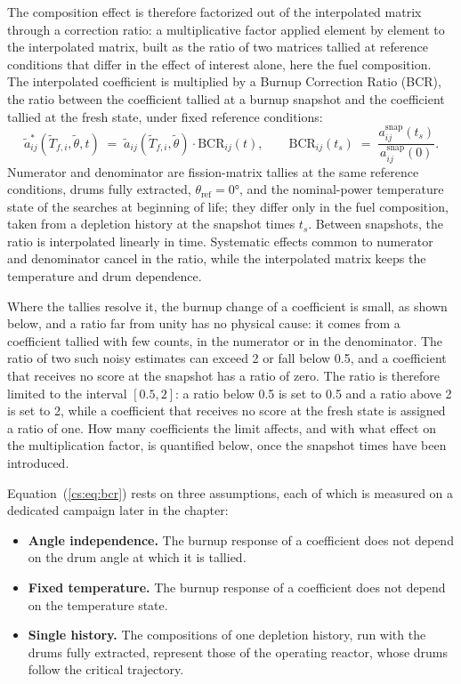 The composition effect is therefore factorized out of the interpolated matrix
through a correction ratio: a multiplicative factor applied element by
element to the interpolated matrix, built as the ratio of two matrices
tallied at reference conditions that differ in the effect of interest alone,
here the fuel composition. The interpolated coefficient is multiplied by a Burnup Correction Ratio (BCR), the ratio between the
coefficient tallied at a burnup snapshot and the coefficient tallied at the
fresh state, under fixed reference conditions:
%
\begin{equation}
  \tilde a^{*}_{ij}(\tilde T_{f,i},\tilde\theta,t) \;=\;
  \tilde a_{ij}(\tilde T_{f,i},\tilde\theta)\cdot \mathrm{BCR}_{ij}(t),
  \qquad
  \mathrm{BCR}_{ij}(t_s) \;=\; \frac{a^{\mathrm{snap}}_{ij}(t_s)}{a^{\mathrm{snap}}_{ij}(0)} .
  \label{cs:eq:bcr}
\end{equation}
%
Numerator and denominator are fission-matrix tallies at the same reference
conditions, drums fully extracted, $\theta_{\mathrm{ref}}=\ang{0}$, and the
nominal-power temperature state of the searches at beginning of life; they
differ only in the fuel composition, taken from a depletion history at the
snapshot times $t_s$. Between snapshots, the ratio is interpolated linearly in
time. Systematic effects common to numerator and denominator cancel in the
ratio, while the interpolated matrix keeps the temperature and drum
dependence.

Where the tallies resolve it, the burnup change of a coefficient is small, as
shown below, and a ratio far from unity has no physical cause: it comes from a
coefficient tallied with few counts, in the numerator or in the denominator.
The ratio of two such noisy estimates can exceed 2 or fall below 0.5, and a
coefficient that receives no score at the snapshot has a ratio of zero. The
ratio is therefore limited to the interval $[0.5,2]$: a ratio below 0.5 is set
to 0.5 and a ratio above 2 is set to 2, while a coefficient that receives no
score at the fresh state is assigned a ratio of one. How many coefficients the limit
affects, and with what effect on the multiplication factor, is quantified
below, once the snapshot times have been introduced.

Equation~(\ref{cs:eq:bcr}) rests on three assumptions, each of which is
measured on a dedicated campaign later in the chapter:
\begin{itemize}
  \item \textbf{Angle independence.} The burnup response of a coefficient does
  not depend on the drum angle at which it is tallied.
  \item \textbf{Fixed temperature.} The burnup response of a coefficient does
  not depend on the temperature state.
  \item \textbf{Single history.} The compositions of one depletion history, run
  with the drums fully extracted, represent those of the operating reactor,
  whose drums follow the critical trajectory.
\end{itemize}

